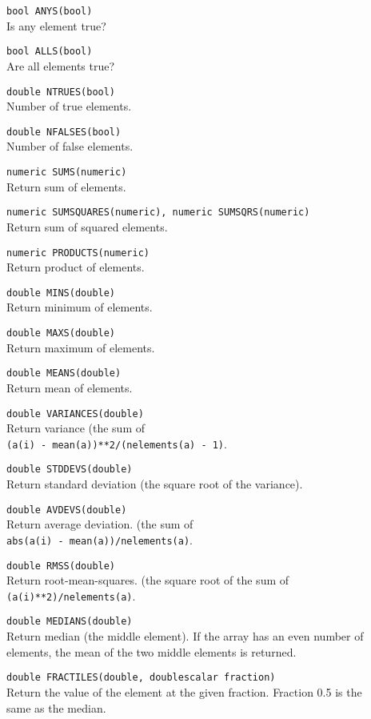 \begin{description}
  \item[] \texttt{bool ANYS(bool)}\\
    Is any element true?
  \item[] \texttt{bool ALLS(bool)}\\
    Are all elements true?
  \item[] \texttt{double NTRUES(bool)}\\
    Number of true elements.
  \item[] \texttt{double NFALSES(bool)}\\
    Number of false elements.
  \item[] \texttt{numeric SUMS(numeric)}\\
    Return sum of elements.
  \item[] \texttt{numeric SUMSQUARES(numeric), numeric SUMSQRS(numeric)}\\
    Return sum of squared elements.
  \item[] \texttt{numeric PRODUCTS(numeric)}\\
    Return product of elements.
  \item[] \texttt{double MINS(double)}\\
    Return minimum of elements.
  \item[] \texttt{double MAXS(double)}\\
    Return maximum of elements.
  \item[] \texttt{double MEANS(double)}\\
    Return mean of elements.
  \item[] \texttt{double VARIANCES(double)}\\
    Return variance (the sum of
    \\\texttt{(a(i) - mean(a))**2/(nelements(a) - 1)}.
  \item[] \texttt{double STDDEVS(double)}\\
    Return standard deviation (the square root of the variance).
  \item[] \texttt{double AVDEVS(double)}\\
    Return average deviation. (the sum of 
    \\\texttt{abs(a(i) - mean(a))/nelements(a)}.
  \item[] \texttt{double RMSS(double)}\\
    Return root-mean-squares. (the square root of the sum of
    \\\texttt{(a(i)**2)/nelements(a)}.
  \item[] \texttt{double MEDIANS(double)}\\
    Return median (the middle element).
    If the array has an even number of elements, the mean of
    the two middle elements is returned.
  \item[] \texttt{double FRACTILES(double, doublescalar fraction)}\\
    Return the value of the element at the given fraction.
    Fraction 0.5 is the same as the median.
\end{description}


